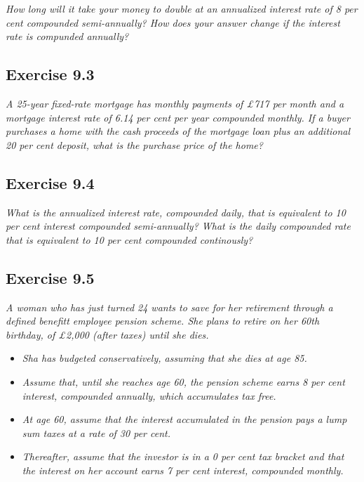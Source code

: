 \documentclass[]{book}
\theoremstyle{definition}
\theoremstyle{definition}
\theoremstyle{remark}
\begin{document}
\emph{How long will it take your money to double at an annualized
interest rate of 8 per cent compounded semi-annually? How does your
answer change if the interest rate is compunded annually?}
\citep[p.306]{book}

\subsection{Exercise 9.3}\label{exercise-9.3}

\emph{A 25-year fixed-rate mortgage has monthly payments of £717 per
month and a mortgage interest rate of 6.14 per cent per year compounded
monthly. If a buyer purchases a home with the cash proceeds of the
mortgage loan plus an additional 20 per cent deposit, what is the
purchase price of the home?} \citep[p.307]{book}

\subsection{Exercise 9.4}\label{exercise-9.4}

\emph{What is the annualized interest rate, compounded daily, that is
equivalent to 10 per cent interest compounded semi-annually? What is the
daily compounded rate that is equivalent to 10 per cent compounded
continously?} \citep[p.307]{book}

\subsection{Exercise 9.5}\label{exercise-9.5}

\emph{A woman who has just turned 24 wants to save for her retirement
through a defined benefitt employee pension scheme. She plans to retire
on her 60th birthday, of £2,000 (after taxes) until she dies.}
\citep[p.307]{book}

\begin{itemize}
\item
  \emph{Sha has budgeted conservatively, assuming that she dies at age
  85.} \citep[p.307]{book}
\item
  \emph{Assume that, until she reaches age 60, the pension scheme earns
  8 per cent interest, compounded annually, which accumulates tax free.}
  \citep[p.307]{book}
\item
  \emph{At age 60, assume that the interest accumulated in the pension
  pays a lump sum taxes at a rate of 30 per cent.} \citep[p.307]{book}
\item
  \emph{Thereafter, assume that the investor is in a 0 per cent tax
  bracket and that the interest on her account earns 7 per cent
  interest, compounded monthly.} \citep[p.307]{book}
\end{itemize}
\end{document}
